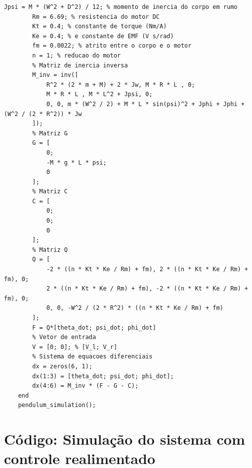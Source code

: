 \documentclass[10pt]{article}
\begin{document}
\begin{appendices}
\begin{lstlisting}[caption={Código da simulação do sistema com ode45}, label=lst:pendulum_sim_l]
        Jpsi = M * (W^2 + D^2) / 12; % momento de inercia do corpo em rumo
        Rm = 6.69; % resistencia do motor DC
        Kt = 0.4; % constante de torque (Nm/A)
        Ke = 0.4; % e constante de EMF (V s/rad)
        fm = 0.0022; % atrito entre o corpo e o motor
        n = 1; % reducao do motor
        % Matriz de inercia inversa
        M_inv = inv([
            R^2 * (2 * m + M) + 2 * Jw, M * R * L , 0;
            M * R * L , M * L^2 + Jpsi, 0;
            0, 0, m * (W^2 / 2) + M * L * sin(psi)^2 + Jphi + Jphi + (W^2 / (2 * R^2)) * Jw
        ]);
        % Matriz G
        G = [
            0;
            -M * g * L * psi;
            0
        ];
        % Matriz C
        C = [
            0;
            0;
            0
        ];
        % Matriz Q
        Q = [
            -2 * ((n * Kt * Ke / Rm) + fm), 2 * ((n * Kt * Ke / Rm) + fm), 0;
            2 * ((n * Kt * Ke / Rm) + fm), -2 * ((n * Kt * Ke / Rm) + fm), 0;
            0, 0, -W^2 / (2 * R^2) * ((n * Kt * Ke / Rm) + fm)
        ];
        F = Q*[theta_dot; psi_dot; phi_dot]
        % Vetor de entrada
        V = [0; 0]; % [V_l; V_r]
        % Sistema de equacoes diferenciais
        dx = zeros(6, 1);
        dx(1:3) = [theta_dot; psi_dot; phi_dot];
        dx(4:6) = M_inv * (F - G - C);
    end
    pendulum_simulation();
\end{lstlisting}

\section{Código: Simulação do sistema com controle realimentado}


\end{appendices}
\end{document}
